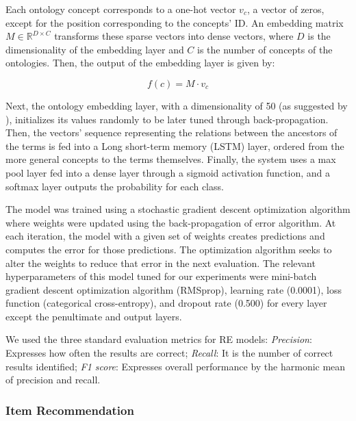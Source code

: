 Each ontology concept corresponds to a one-hot vector $v_c$, a vector of zeros, except for the position corresponding to the concepts' ID. An embedding matrix $M \in \mathbb{R}^{D \times C}$ transforms these sparse vectors into dense vectors, where $D$ is the dimensionality of the embedding layer and $C$ is the number of concepts of the ontologies. Then, the output of the embedding layer is given by:

\begin{equation}
f(c) = M \cdot v_c
\label{equation:ontologyembedding}
\end{equation}

Next, the ontology embedding layer, with a dimensionality of 50 (as suggested by \cite{lamurias2019bo}), initializes its values randomly to be later tuned through back-propagation. Then, the vectors' sequence representing the relations between the ancestors of the terms is fed into a Long short-term memory (LSTM) layer, ordered from the more general concepts to the terms themselves. Finally, the system uses a max pool layer fed into a dense layer through a sigmoid activation function, and a softmax layer outputs the probability for each class.

The model was trained using a stochastic gradient descent optimization algorithm where weights were updated using the back-propagation of error algorithm. At each iteration, the model with a given set of weights creates predictions and computes the error for those predictions. The optimization algorithm seeks to alter the weights to reduce that error in the next evaluation. The relevant hyperparameters of this model tuned for our experiments were mini-batch gradient descent optimization algorithm (RMSprop), learning rate (0.0001), loss function (categorical cross-entropy), and dropout rate (0.500) for every layer except the penultimate and output layers.

We used the three standard evaluation metrics for RE models:
\textit{Precision}: Expresses how often the results are correct;
\textit{Recall}: It is the number of correct results identified;
\textit{F1 score}: Expresses overall performance by the harmonic mean of precision and recall.


\subsubsection{Item Recommendation} 

